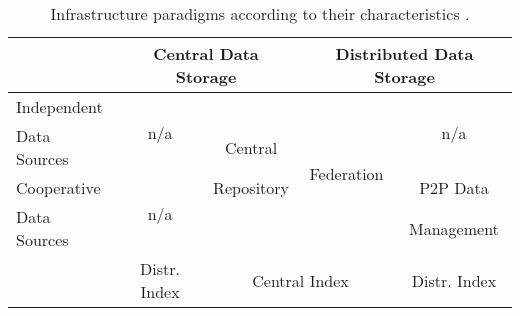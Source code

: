 

\begin{table}[htbp]
  \caption{Infrastructure paradigms according to their characteristics \citep{gorlitz_federated_2011}.}
  \begin{center}
    \begin{tabular}{l|c|c|c|c|}
      \cline{2-5}
      ~ & \multicolumn{2}{c|}{Central Data Storage} & \multicolumn{2}{c|}{Distributed Data Storage} \\
      \hline
      \multicolumn{1}{|l|}{Independent} & \multirow{2}{*}{n/a} & ~ & \multirow{4}{*}{Federation} & \multirow{2}{*}{n/a} \\
      \multicolumn{1}{|l|}{Data Sources} & ~ & Central &~ & ~ \\
      \cline{1-2} \cline{5-5}
      \multicolumn{1}{|l|}{Cooperative} & \multirow{2}{*}{n/a} & Repository & ~ & P2P Data \\
      \multicolumn{1}{|l|}{Data Sources} & ~ & ~ & ~ & Management \\
      \hline
      ~ & Distr. Index & \multicolumn{2}{c|}{Central Index} & Distr. Index \\
      \cline{2-5}
    \end{tabular}
  \end{center}
  \label{tab:infrastructure_lod}
\end{table}